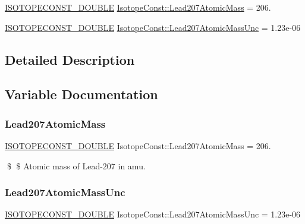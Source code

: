 \begin{DoxyCompactItemize}
\item 
\mbox{\hyperlink{group___isotope_const-_macros_ga8f45a7272ce02c0b4c65c44636ed719a}{I\+S\+O\+T\+O\+P\+E\+C\+O\+N\+S\+T\+\_\+\+D\+O\+U\+B\+LE}} \mbox{\hyperlink{group___isotope_const-_lead-_pb207_ga9b2f7b5598d7aaf995c754524b2d332e}{Isotope\+Const\+::\+Lead207\+Atomic\+Mass}} = 206.
\item 
\mbox{\hyperlink{group___isotope_const-_macros_ga8f45a7272ce02c0b4c65c44636ed719a}{I\+S\+O\+T\+O\+P\+E\+C\+O\+N\+S\+T\+\_\+\+D\+O\+U\+B\+LE}} \mbox{\hyperlink{group___isotope_const-_lead-_pb207_gaeb0fb8c2dbe0f75ecc97802bfa64ac22}{Isotope\+Const\+::\+Lead207\+Atomic\+Mass\+Unc}} = 1.\+23e-\/06
\end{DoxyCompactItemize}


\subsection{Detailed Description}


\subsection{Variable Documentation}
\mbox{\label{group___isotope_const-_lead-_pb207_ga9b2f7b5598d7aaf995c754524b2d332e}} 
\subsubsection{\texorpdfstring{Lead207\+Atomic\+Mass}{Lead207AtomicMass}}
{\footnotesize\ttfamily \mbox{\hyperlink{group___isotope_const-_macros_ga8f45a7272ce02c0b4c65c44636ed719a}{I\+S\+O\+T\+O\+P\+E\+C\+O\+N\+S\+T\+\_\+\+D\+O\+U\+B\+LE}} Isotope\+Const\+::\+Lead207\+Atomic\+Mass = 206.}

\$ \$ Atomic mass of Lead-\/207 in amu. \mbox{\label{group___isotope_const-_lead-_pb207_gaeb0fb8c2dbe0f75ecc97802bfa64ac22}} 
\subsubsection{\texorpdfstring{Lead207\+Atomic\+Mass\+Unc}{Lead207AtomicMassUnc}}
{\footnotesize\ttfamily \mbox{\hyperlink{group___isotope_const-_macros_ga8f45a7272ce02c0b4c65c44636ed719a}{I\+S\+O\+T\+O\+P\+E\+C\+O\+N\+S\+T\+\_\+\+D\+O\+U\+B\+LE}} Isotope\+Const\+::\+Lead207\+Atomic\+Mass\+Unc = 1.\+23e-\/06}

